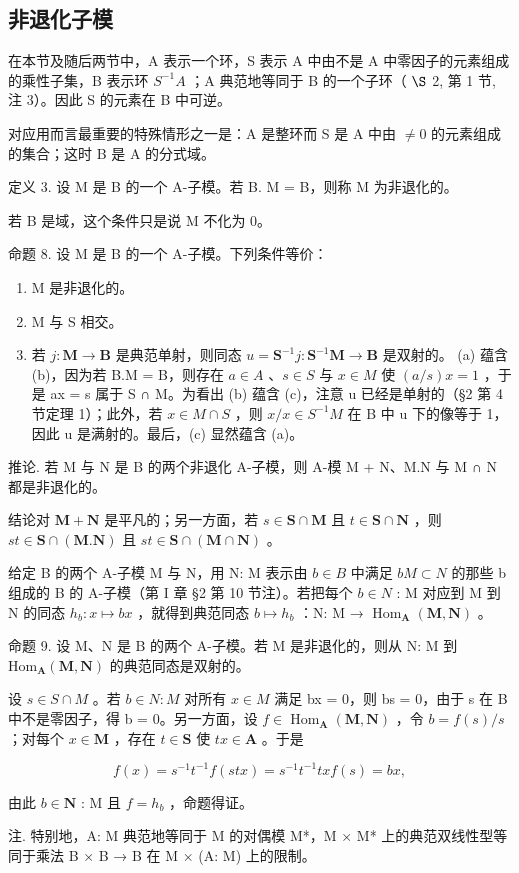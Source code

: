 \subsection{非退化子模}

在本节及随后两节中，A 表示一个环，S 表示 A 中由不是 A 中零因子的元素组成的乘性子集，B 表示环 \(S^{-1}A\) ；A 典范地等同于 B 的一个子环（ \(\S\) 2, 第 1 节, 注 3）。因此 S 的元素在 B 中可逆。

对应用而言最重要的特殊情形之一是：A 是整环而 S 是 A 中由 \(\neq0\) 的元素组成的集合；这时 B 是 A 的分式域。

定义 3. 设 M 是 B 的一个 A-子模。若 B. M = B，则称 M 为非退化的。

若 B 是域，这个条件只是说 M 不化为 0。

命题 8. 设 M 是 B 的一个 A-子模。下列条件等价：

\begin{enumerate}
\def\labelenumi{(\alph{enumi})}
\item
  M 是非退化的。
\item
  M 与 S 相交。
\item
  若 \(j: \mathbf{M} \to \mathbf{B}\) 是典范单射，则同态 \(u = \mathbf{S}^{-1}j: \mathbf{S}^{-1}\mathbf{M} \to \mathbf{B}\) 是双射的。
  (a) 蕴含 (b)，因为若 B.M = B，则存在 \(a \in A\) 、\(s \in S\) 与 \(x \in M\) 使 \((a/s)x = 1\) ，于是 ax = s 属于 S ∩ M。为看出 (b) 蕴含 (c)，注意 u 已经是单射的（§2 第 4 节定理 1）；此外，若 \(x \in M \cap S\) ，则 \(x/x \in S^{-1}M\) 在 B 中 u 下的像等于 1，因此 u 是满射的。最后，(c) 显然蕴含 (a)。
\end{enumerate}

推论. 若 M 与 N 是 B 的两个非退化 A-子模，则 A-模 M + N、M.N 与 M ∩ N 都是非退化的。

结论对 \(\mathbf{M} + \mathbf{N}\) 是平凡的；另一方面，若 \(s \in \mathbf{S} \cap \mathbf{M}\) 且 \(t \in \mathbf{S} \cap \mathbf{N}\) ，则 \(st \in \mathbf{S} \cap (\mathbf{M}. \mathbf{N})\) 且 \(st \in \mathbf{S} \cap (\mathbf{M} \cap \mathbf{N})\) 。

给定 B 的两个 A-子模 M 与 N，用 N: M 表示由 \(b \in B\) 中满足 \(bM \subset N\) 的那些 b 组成的 B 的 A-子模（第 I 章 §2 第 10 节注）。若把每个 \(b \in N\) : M 对应到 M 到 N 的同态 \(h_{b}: x \mapsto bx\) ，就得到典范同态 \(b \mapsto h_{b}\) ：N: M → \(\operatorname{Hom}_{\mathbf{A}}(\mathbf{M}, \mathbf{N})\) 。

命题 9. 设 M、N 是 B 的两个 A-子模。若 M 是非退化的，则从 N: M 到 \(\mathrm{Hom}_{\mathbf{A}}(\mathbf{M},\mathbf{N})\) 的典范同态是双射的。

设 \(s \in S \cap M\) 。若 \(b \in N: M\) 对所有 \(x \in M\) 满足 bx = 0，则 bs = 0，由于 s 在 B 中不是零因子，得 b = 0。另一方面，设 \(f \in \operatorname{Hom}_{\mathbf{A}}(\mathbf{M}, \mathbf{N})\) ，令 \(b = f(s) / s\) ；对每个 \(x \in \mathbf{M}\) ，存在 \(t \in \mathbf{S}\) 使 \(tx \in \mathbf{A}\) 。于是

\[
f (x) = s ^ {- 1} t ^ {- 1} f (s t x) = s ^ {- 1} t ^ {- 1} t x f (s) = b x,
\]

由此 \(b \in \mathbf{N}\) : M 且 \(f = h_b\) ，命题得证。

注. 特别地，A: M 典范地等同于 M 的对偶模 M*，M × M* 上的典范双线性型等同于乘法 B × B → B 在 M × (A: M) 上的限制。

